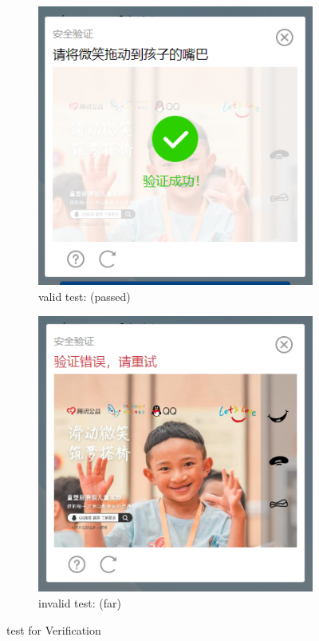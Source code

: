 \documentclass[11pt, oneside]{article}  %
\begin{document}
\begin{figure}[H]
    \centering
	\begin{subfigure}{0.4\linewidth}
		\includegraphics[width=1\linewidth]{./pic/3.3.7.png}
        \caption{valid test: (passed)}
	\end{subfigure}
    \begin{subfigure}{0.4\linewidth}
		\includegraphics[width=1\linewidth]{./pic/3.3.5.png}
        \caption{invalid test: (far)}
	\end{subfigure}
    \caption{test for Verification}
\end{figure}
\end{document}
